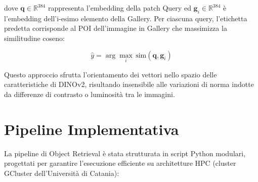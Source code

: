\documentclass[a4paper,12pt]{report}
\begin{document}
dove $\mathbf{q} \in \mathbb{R}^{384}$ rappresenta l'embedding della patch Query ed $\mathbf{g}_i \in \mathbb{R}^{384}$ è l'embedding dell'i-esimo elemento della Gallery. Per ciascuna query, l'etichetta predetta corrisponde al POI dell'immagine in Gallery che massimizza la similitudine coseno:

\begin{equation}
\hat{y} = \arg\max_{i} \, \text{sim}(\mathbf{q}, \mathbf{g}_i)
\end{equation}

Questo approccio sfrutta l'orientamento dei vettori nello spazio delle caratteristiche di DINOv2, risultando insensibile alle variazioni di norma indotte da differenze di contrasto o luminosità tra le immagini.

\section{Pipeline Implementativa}

La pipeline di Object Retrieval è stata strutturata in script Python modulari, progettati per garantire l'esecuzione efficiente su architetture HPC (cluster GCluster dell'Università di Catania):
\end{document}
